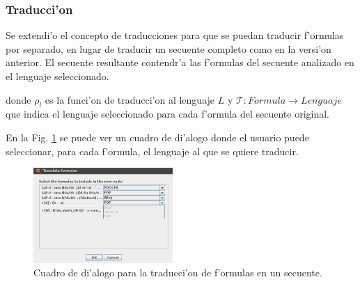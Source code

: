 \subsubsection{Traducci'on}

Se extendi'o el concepto de traducciones para que se puedan traducir f'ormulas por separado, en lugar de traducir un secuente completo como en la versi'on anterior.
El secuente resultante contendr'a las f'ormulas del secuente analizado en el lenguaje seleccionado.

\begin{prooftree}
\end{prooftree}

donde $\rho_l$ es la funci'on de traducci'on al lenguaje $L$ y $\mathcal{T}:Formula\rightarrow Lenguaje$ que indica el lenguaje seleccionado para cada f'ormula del secuente original.



En la Fig. \ref{GUI form translation} se puede ver un cuadro de di'alogo donde el usuario puede seleccionar, para cada f'ormula, el lenguaje al que se quiere traducir.

\begin{figure}[]
	\includegraphics[width=200px]{img/translate.png}
	\centering
	\caption{Cuadro de di'alogo para la traducci'on de f'ormulas en un secuente.} \label{GUI form translation}
\end{figure}


